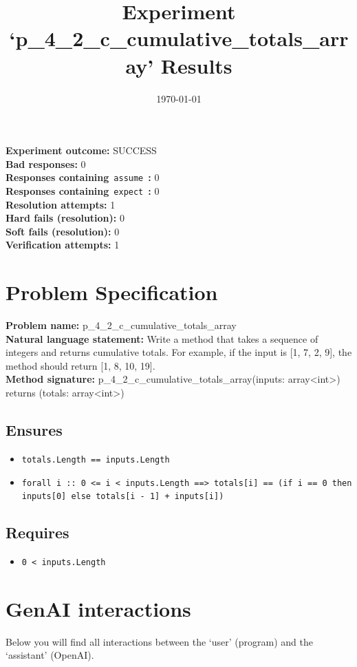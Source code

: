 \documentclass{article}
\begin{document}
\title{Experiment `p\_4\_2\_c\_cumulative\_totals\_array' Results}
\author{\today}
\date{}
\maketitle
\textbf{Experiment outcome: }SUCCESS
\\\textbf{Bad responses: }0
\\\textbf{Responses containing}~\texttt{assume}~\textbf{: }0
\\\textbf{Responses containing}~\texttt{expect}~\textbf{: }0
\\\textbf{Resolution attempts: }1
\\\textbf{Hard fails (resolution): }0
\\\textbf{Soft fails (resolution): }0
\\\textbf{Verification attempts: }1
\section*{Problem Specification}
\textbf{Problem name: }p\_4\_2\_c\_cumulative\_totals\_array
\\\textbf{Natural language statement: }Write a method that takes a sequence of integers and returns cumulative totals. For example, if the input is [1, 7, 2, 9], the method should return [1, 8, 10, 19].
\\\textbf{Method signature: }p\_4\_2\_c\_cumulative\_totals\_array(inputs: array<int>) returns (totals: array<int>)
\subsection*{Ensures}
\begin{itemize}
\item \texttt{totals.Length == inputs.Length}
\item \texttt{forall i :: 0 <= i < inputs.Length ==> totals[i] == (if i == 0 then inputs[0] else totals[i - 1] + inputs[i])}
\end{itemize}
\subsection*{Requires}
\begin{itemize}
\item \texttt{0 < inputs.Length}
\end{itemize}
\clearpage
\section*{GenAI interactions}
Below you will find all interactions between the `user' (program) and the `assistant' (OpenAI).
\end{document}
